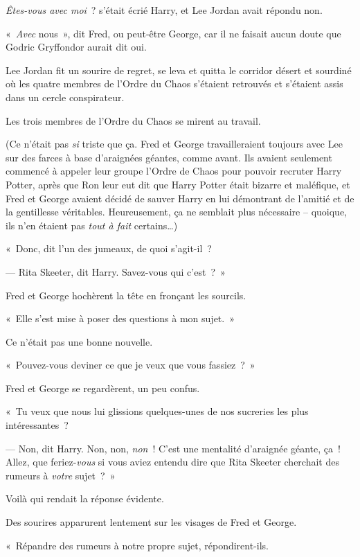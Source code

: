 \emph{Êtes-vous avec moi}~? s'était écrié Harry, et Lee Jordan avait répondu non.

«~\emph{Avec} nous~», dit Fred, ou peut-être George, car il ne faisait aucun doute que Godric Gryffondor aurait dit oui.

Lee Jordan fit un sourire de regret, se leva et quitta le corridor désert et sourdiné où les quatre membres de l'Ordre du Chaos s'étaient retrouvés et s'étaient assis dans un cercle conspirateur.

Les trois membres de l'Ordre du Chaos se mirent au travail.

(Ce n'était pas \emph{si} triste que ça. Fred et George travailleraient toujours avec Lee sur des farces à base d'araignées géantes, comme avant. Ils avaient seulement commencé à appeler leur groupe l'Ordre de Chaos pour pouvoir recruter Harry Potter, après que Ron leur eut dit que Harry Potter était bizarre et maléfique, et Fred et George avaient décidé de sauver Harry en lui démontrant de l'amitié et de la gentillesse véritables. Heureusement, ça ne semblait plus nécessaire -- quoique, ils n'en étaient pas \emph{tout à fait} certains…)

«~Donc, dit l'un des jumeaux, de quoi s'agit-il~?

--- Rita Skeeter, dit Harry. Savez-vous qui c'est~?~»

Fred et George hochèrent la tête en fronçant les sourcils.

«~Elle s'est mise à poser des questions à mon sujet.~»

Ce n'était pas une bonne nouvelle.

«~Pouvez-vous deviner ce que je veux que vous fassiez~?~»

Fred et George se regardèrent, un peu confus.

«~Tu veux que nous lui glissions quelques-unes de nos sucreries les plus intéressantes~?

--- Non, dit Harry. Non, non, \emph{non}~! C'est une mentalité d'araignée géante, ça~! Allez, que feriez-\emph{vous} si vous aviez entendu dire que Rita Skeeter cherchait des rumeurs à \emph{votre} sujet~?~»

Voilà qui rendait la réponse évidente.

Des sourires apparurent lentement sur les visages de Fred et George.

«~Répandre des rumeurs à notre propre sujet, répondirent-ils.

